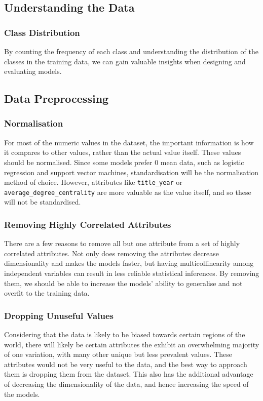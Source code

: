 
\subsection{Understanding the Data}
\subsubsection{Class Distribution} 
By counting the frequency of each class and understanding the distribution of the classes in the training data, we can gain valuable insights when designing and evaluating models.

\subsection{Data Preprocessing}

\subsubsection{Normalisation}
For most of the numeric values in the dataset, the important information is how it compares to other values, rather than the actual value itself. These values should be normalised. Since some models prefer 0 mean data, such as logistic regression and support vector machines, standardisation will be the normalisation method of choice. However, attributes like \texttt{title\_year} or \texttt{average\_degree\_centrality} are more valuable as the value itself, and so these will not be standardised.

\subsubsection{Removing Highly Correlated Attributes}
There are a few reasons to remove all but one attribute from a set of highly correlated attributes. Not only does removing the attributes decrease dimensionality and makes the models faster, but having multicollinearity among independent variables can result in less reliable statistical inferences. By removing them, we should be able to increase the models' ability to generalise and not overfit to the training data.


\subsubsection{Dropping Unuseful Values}
Considering that the data is likely to be biased towards certain regions of the world, there will likely be certain attributes the exhibit an overwhelming majority of one variation, with many other unique but less prevalent values. These attributes would not be very useful to the data, and the best way to approach them is dropping them from the dataset. This also has the additional advantage of decreasing the dimensionality of the data, and hence increasing the speed of the models.

